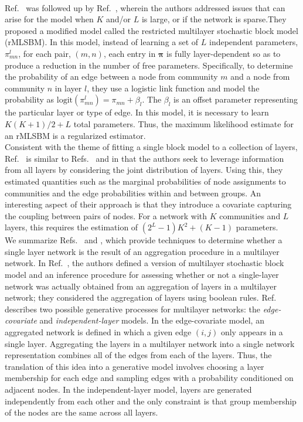 \\\indent Ref.~\cite{airoldi} was followed up by Ref.~\cite{mlsbm1}, wherein the authors addressed issues that can arise for the model when $K$ and/or $L$ is large, or if the network is sparse.They proposed a modified model called the restricted multilayer stochastic block model (rMLSBM). 
In this model, instead of learning a set of $L$ independent parameters, ${ \pi}^l_{mn}$, for each pair, $(m,n)$, each entry in ${\boldsymbol \pi}$ is fully layer-dependent so as to produce a reduction in the number of free parameters. Specifically, to determine the probability of an edge between a node from community $m$ and a node from community $n$ in layer $l$, they use a logistic link function and model the probability as $\text{logit}({ \pi}_{mn}^{l})={\pi}_{mn}+\beta_{l}$. The $\beta_{l}$ is an offset parameter representing the particular layer or type of edge. In this model, it is necessary %
to learn $K(K+1)/2+L$ total parameters. Thus, the maximum likelihood estimate for an rMLSBM is a regularized estimator.\\
\indent  Consistent with the theme of fitting a single block model to a collection of layers, Ref.~\cite{barbillon} is similar to Refs.~\cite{airoldi} and \cite{mlsbm1} in that the authors seek to leverage information from all layers by considering the joint distribution of layers. Using this, they estimated quantities such as the marginal probabilities of node assignments to communities and the edge probabilities within and between groups. An interesting aspect of their approach is that they introduce a covariate capturing the coupling between pairs of nodes. For a network with $K$ communities and $L$ layers, this requires the estimation of $(2^{L}-1)K^{2}+(K-1)$ parameters. 
\\\indent We summarize Refs.~\cite{catala} and \cite{thiagomlsbm}, which provide techniques to determine whether a single layer network is the result of an aggregation procedure in a multilayer network. In Ref.~\cite{catala}, the authors defined a version of multilayer stochastic block model and an inference procedure for assessing whether or not a single-layer network was actually obtained from an aggregation of layers in a multilayer network; they considered the 
aggregation of layers using boolean rules. Ref.~\cite{thiagomlsbm} describes two possible generative processes for multilayer networks: the \emph{edge-covariate} and \emph{independent-layer} models. In the edge-covariate model, an aggregated network is defined in which a given edge $(i,j)$ only appears in a single layer. Aggregating the layers in a multilayer network into a single network representation combines all of the edges from each of the layers. Thus, the translation of this idea into a generative model involves choosing a layer membership for each edge and sampling edges with a probability conditioned on adjacent nodes. In the independent-layer model, layers are generated independently from each other and the only constraint is that group membership of the nodes are the same across all layers. \\
